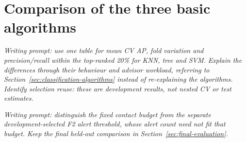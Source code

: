 \section{Comparison of the three basic algorithms}
\label{sec:basic-comparison}

\emph{Writing prompt: use one table for mean CV AP, fold variation and
precision/recall within the top-ranked 20\% for KNN, tree and SVM. Explain the
differences through their behaviour and advisor workload, referring to
Section~\ref{sec:classification-algorithms} instead of re-explaining the algorithms.
Identify selection reuse: these are development results, not nested CV or test estimates.}

\emph{Writing prompt: distinguish the fixed contact budget from the separate
development-selected F2 alert threshold, whose alert count need not fit that
budget. Keep the final held-out comparison in Section~\ref{sec:final-evaluation}.}

